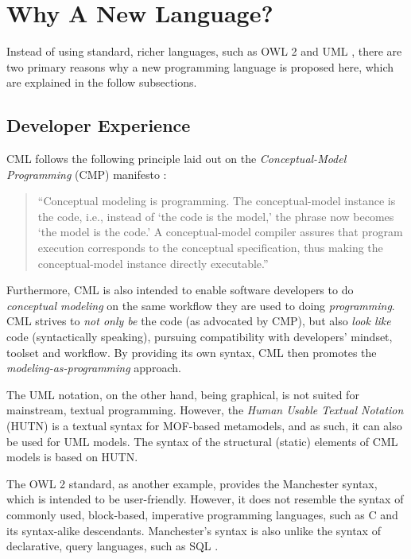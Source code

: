 \section{Why A New Language?}\label{sec:why}

Instead of using standard, richer languages, such as OWL 2 \cite{owl2} and UML \cite{uml}, there are two primary reasons why a new programming language is proposed here, which are explained in the follow subsections.

\subsection{Developer Experience}

CML follows the following principle laid out on the \emph{Conceptual-Model Programming} (CMP) manifesto \cite{cmp}:

\begin{quote}
``Conceptual modeling is programming.
The conceptual-model instance is the code,
i.e., instead of `the code is the model,'
the phrase now becomes `the model is the code.'
A conceptual-model compiler assures that program execution corresponds to the conceptual specification,
thus making the conceptual-model instance directly executable.''
\end{quote}

Furthermore,
CML is also intended to enable software developers to do \emph{conceptual modeling} on the same workflow they are used to doing \emph{programming}.
CML strives to \emph{not only be} the code (as advocated by CMP),
but also \emph{look like} code (syntactically speaking),
pursuing compatibility with developers' mindset, toolset and workflow.
By providing its own syntax,
CML then promotes the \emph{modeling-as-programming} approach. 

The UML \cite{uml} notation, on the other hand,
being graphical,
is not suited for mainstream, textual programming.
However, the \emph{Human Usable Textual Notation} (HUTN) \cite{hutn} is a textual syntax for MOF-based \cite{mof} metamodels,
and as such, it can also be used for UML models.
The syntax of the structural (static) elements of CML models is based on HUTN.

The OWL 2 standard, as another example, provides the Manchester \cite{owl2manchester} syntax,
which is intended to be user-friendly.
However, it does not resemble the syntax of commonly used, block-based, imperative programming languages,
such as C \cite{clang} and its syntax-alike descendants.
Manchester's syntax is also unlike the syntax of declarative, query languages, such as SQL \cite{sql}.


